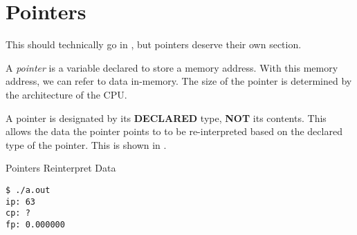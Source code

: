 \section{Pointers}\label{sec:Pointers}
This should technically go in , but pointers deserve their own section.

\begin{definition}[Pointer]\label{def:Pointer}
A \emph{pointer} is a variable declared to store a memory address.
With this memory address, we can refer to data in-memory.
The size of the pointer is determined by the architecture of the CPU.\@
\end{definition}

A pointer is designated by its \textbf{DECLARED} type, \textbf{NOT} its contents.
This allows the data the pointer points to to be re-interpreted based on the declared type of the pointer.
This is shown in .

\begin{listing}[h!tbp]
\caption{Pointers Reinterpret Data}
\label{lst:Pointers_Reinterpret_Data}

\begin{verbatim}
$ ./a.out
ip: 63
cp: ?
fp: 0.000000
\end{verbatim}
\end{listing}


